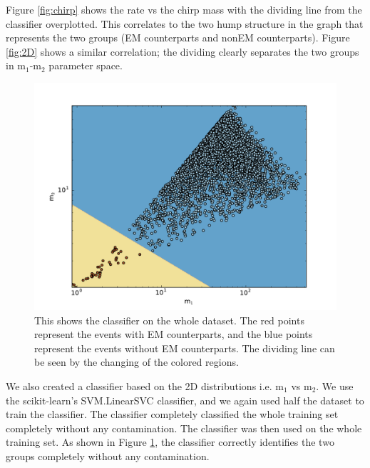 Figure \ref{fig:chirp} shows the rate vs the chirp mass with the dividing line from the classifier overplotted. This correlates to the two hump structure in the graph that represents the two groups (EM counterparts and nonEM counterparts). Figure \ref{fig:2D} shows a similar correlation; the dividing clearly separates the two groups in  m$_{1}$-m$_{2}$ parameter space.

\begin{figure}[ht]
  \includegraphics[width=\columnwidth]{img/classifier-2D.pdf}
  \caption{This shows the classifier on the whole dataset. The red points represent the events with EM counterparts, and the blue points represent the events without EM counterparts. The dividing line can be seen by the changing of the colored regions.}
  \label{fig:2dclass}
\end{figure}

We also created a classifier based on the 2D distributions i.e. m$_1$ vs m$_2$. We use the scikit-learn's SVM.LinearSVC classifier, and we again used half the dataset to train the classifier. The classifier completely classified the whole training set completely without any contamination. The classifier was then used on the whole training set. As shown in Figure \ref{fig:2dclass}, the classifier correctly identifies the two groups completely without any contamination.